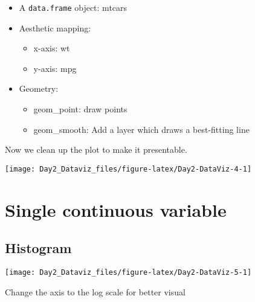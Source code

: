 \documentclass[12pt,letterpaperpaper,openany]{book}
\newenvironment{Shaded}{\begin{snugshade}}{\end{snugshade}}
\newcommand{\DataTypeTok}[1]{\textcolor[rgb]{0.13,0.29,0.53}{#1}}
\newcommand{\KeywordTok}[1]{\textcolor[rgb]{0.13,0.29,0.53}{\textbf{#1}}}
\newcommand{\NormalTok}[1]{#1}
\newcommand{\OperatorTok}[1]{\textcolor[rgb]{0.81,0.36,0.00}{\textbf{#1}}}
\newcommand{\StringTok}[1]{\textcolor[rgb]{0.31,0.60,0.02}{#1}}
\providecommand{\tightlist}{%
  \setlength{\itemsep}{0pt}\setlength{\parskip}{0pt}}
\begin{document}
\begin{itemize}
\tightlist
\item
  A \texttt{data.frame} object: mtcars
\item
  Aesthetic mapping:

  \begin{itemize}
  \tightlist
  \item
    x-axis: wt
  \item
    y-axis: mpg
  \end{itemize}
\item
  Geometry:

  \begin{itemize}
  \tightlist
  \item
    geom\_point: draw points
  \item
    geom\_smooth: Add a layer which draws a best-fitting line
  \end{itemize}
\end{itemize}

Now we clean up the plot to make it presentable.

\texttt{[image: Day2\_Dataviz\_files/figure-latex/Day2-DataViz-4-1]}

\hypertarget{single-continuous-variable}{%
\section{Single continuous variable}\label{single-continuous-variable}}

\hypertarget{histogram}{%
\subsection{Histogram}\label{histogram}}

\begin{Shaded}
\end{Shaded}

\texttt{[image: Day2\_Dataviz\_files/figure-latex/Day2-DataViz-5-1]}

Change the axis to the log scale for better visual
\end{document}
